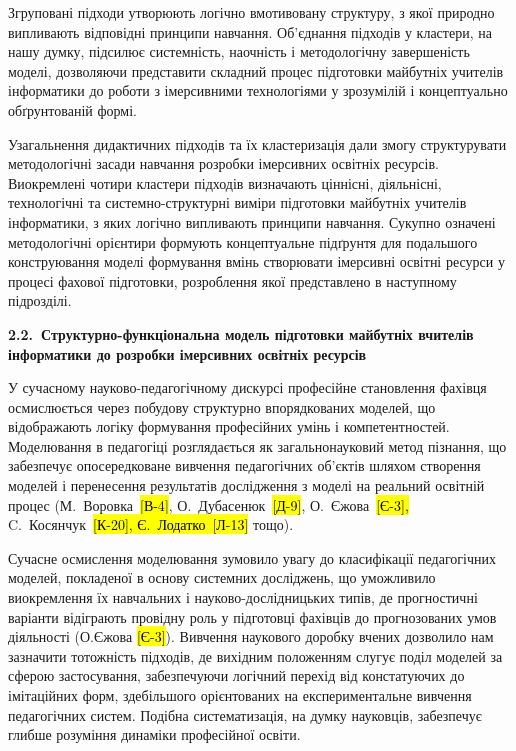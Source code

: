Згруповані підходи утворюють логічно вмотивовану структуру, з якої природно випливають відповідні принципи навчання. Об'єднання підходів у кластери, на нашу думку, підсилює системність, наочність і методологічну завершеність моделі, дозволяючи представити складний процес підготовки майбутніх учителів інформатики до роботи з імерсивними технологіями у зрозумілій і концептуально обґрунтованій формі.

Узагальнення дидактичних підходів та їх кластеризація дали змогу структурувати методологічні засади навчання розробки імерсивних освітніх ресурсів. Виокремлені чотири кластери підходів визначають ціннісні, діяльнісні, технологічні та системно-структурні виміри підготовки майбутніх учителів інформатики, з яких логічно випливають принципи навчання. Сукупно означені методологічні орієнтири формують концептуальне підґрунтя для подальшого конструювання моделі формування вмінь створювати імерсивні освітні ресурси у процесі фахової підготовки, розроблення якої представлено в наступному підрозділі.

\textbf{2.2.~Структурно-функціональна модель підготовки майбутніх вчителів інформатики до розробки імерсивних освітніх ресурсів}

У сучасному науково-педагогічному дискурсі професійне становлення фахівця осмислюється через побудову структурно впорядкованих моделей, що відображають логіку формування професійних умінь і компетентностей. Моделювання в педагогіці розглядається як загальнонауковий метод пізнання, що забезпечує опосередковане вивчення педагогічних об'єктів шляхом створення моделей і перенесення результатів дослідження з моделі на реальний освітній процес (М.~Воровка~\hl{{[}В-4{]}}, О.~Дубасенюк~\hl{{[}Д-9{]}}, О.~Єжова~\hl{{[}Є-3{]},} C.~Косянчук~\hl{{[}К-20{]}, Є.~Лодатко~{[}Л-13{]}} тощо).

Сучасне осмислення моделювання зумовило увагу до класифікації педагогічних моделей, покладеної в основу системних досліджень, що уможливило виокремлення їх навчальних і науково-дослідницьких типів, де прогностичні варіанти відіграють провідну роль у підготовці фахівців до прогнозованих умов діяльності (О.Єжова \hl{{[}Є-3{]}}). Вивчення наукового доробку вчених дозволило нам зазначити тотожність підходів, де вихідним положенням слугує поділ моделей за сферою застосування, забезпечуючи логічний перехід від констатуючих до імітаційних форм, здебільшого орієнтованих на експериментальне вивчення педагогічних систем. Подібна систематизація, на думку науковців, забезпечує глибше розуміння динаміки професійної освіти.


